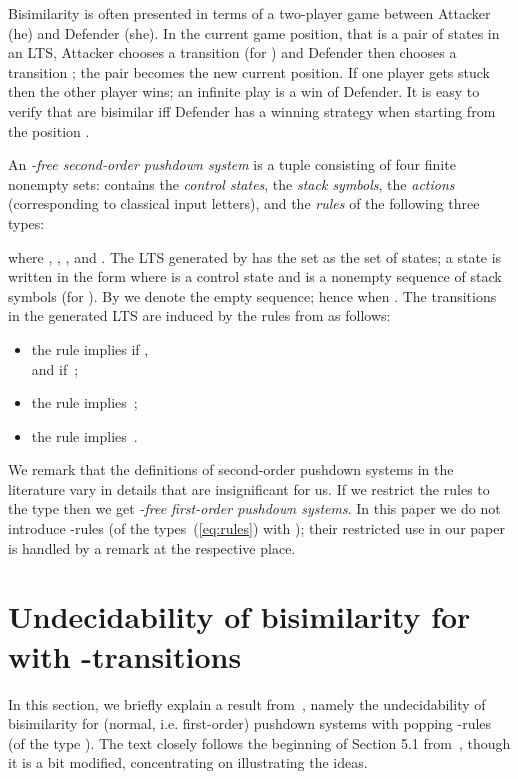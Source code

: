 \documentclass[11pt]{article}
\newcommand{\pda}{\text{PDA}\xspace}
\begin{document}
Bisimilarity is often presented
in terms of a two-player game
between Attacker (he) and Defender (she).
In the current game position, that is a pair of states  
in an LTS,
Attacker chooses a transition  (for )
and Defender then chooses a transition
; 
the pair  becomes the new current position.
If one player gets stuck then the other player wins;
an infinite play is a win of Defender. It is easy to verify
that  are
bisimilar iff Defender has a winning strategy when starting from
the position .

An \emph{-free second-order pushdown system}
is a tuple  consisting of
four finite nonempty sets:
 contains the
\emph{control states}, 
 the \emph{stack symbols},
 the
\emph{actions} (corresponding to classical input letters),
and  the \emph{rules} of the following three types:

where  , 
,
, and .
The LTS generated by 
has the set  as the set of states; 
a state is written in the form 
where  is a control state and 
 is a nonempty sequence of stack symbols (for ).
By  we denote the empty sequence; hence
 when .
The transitions in the generated LTS are induced by the rules from  as
follows:
\begin{itemize}
\item
the rule  implies 
 if
,
\\
and   if \,;
\item the rule
 implies 
\,;
\item the rule
 implies 
\,.
\end{itemize}
We remark that the definitions of second-order pushdown systems in the
literature vary in details that are insignificant for us.
If we restrict the rules to the type  then we get 
\emph{-free first-order pushdown systems}.
In this paper we do not introduce -rules 
(of the types~(\ref{eq:rules}) with );
their restricted use in our paper is handled by a remark at the
respective place. 


\section{Undecidability of bisimilarity for \pda with
-transitions}\label{sec:undecepsilon}

In this section, we briefly explain a result
from~\cite{DBLP:journals/jacm/JancarS08}, namely the undecidability of
bisimilarity for (normal, i.e. first-order) pushdown systems with 
popping -rules (of the type ). 
The text closely follows the beginning of Section 5.1
from~\cite{DBLP:journals/jacm/JancarS08}, though it is 
a bit modified, concentrating on illustrating the ideas.
\end{document}
